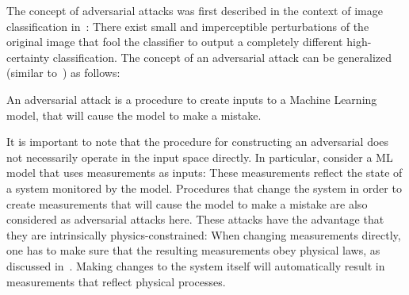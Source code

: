 The concept of adversarial attacks was first described in the context of image classification in~\cite{basic_adversarials}: There exist small and imperceptible perturbations of the original image that fool the classifier to output a completely different high-certainty classification.
The concept of an adversarial attack can be generalized (similar to~\cite{adversarial_definition}) as follows:
\begin{definition}
An adversarial attack is a procedure to create inputs to a Machine Learning
model, that will cause the model to make a mistake.
\end{definition}
It is important to note that the procedure for constructing an adversarial does not necessarily operate in the input space directly. In particular, consider a ML model that uses measurements as inputs:
These measurements reflect the state of a system monitored by the model.
Procedures that change the system in order to create measurements that will
cause the model to make a mistake are also considered as adversarial attacks
here. These attacks have the advantage that they are intrinsically
physics-constrained: When changing measurements directly, one has to make sure
that the resulting measurements obey physical laws, as discussed in~\cite{conaml}. Making changes to the system itself will
automatically result in measurements that reflect physical processes.
